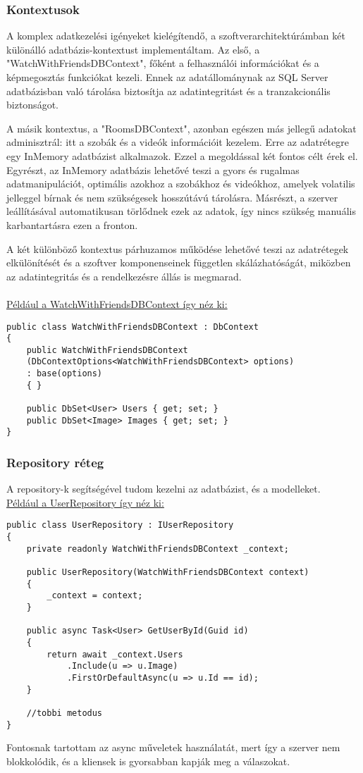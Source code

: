 \subsubsection*{Kontextusok}
A komplex adatkezelési igényeket kielégítendő, a szoftverarchitektúrámban két különálló adatbázis-kontextust implementáltam. Az első, a "WatchWithFriendsDBContext", főként a felhasználói információkat és a képmegosztás funkciókat kezeli. Ennek az adatállománynak az SQL Server adatbázisban való tárolása biztosítja az adatintegritást és a tranzakcionális biztonságot.

A másik kontextus, a "RoomsDBContext", azonban egészen más jellegű adatokat adminisztrál: itt a szobák és a videók információit kezelem. Erre az adatrétegre egy InMemory adatbázist alkalmazok. Ezzel a megoldással két fontos célt érek el. Egyrészt, az InMemory adatbázis lehetővé teszi a gyors és rugalmas adatmanipulációt, optimális azokhoz a szobákhoz és videókhoz, amelyek volatilis jelleggel bírnak és nem szükségesek hosszútávú tárolásra. Másrészt, a szerver leállításával automatikusan törlődnek ezek az adatok, így nincs szükség manuális karbantartásra ezen a fronton.

A két különböző kontextus párhuzamos működése lehetővé teszi az adatrétegek elkülönítését és a szoftver komponenseinek független skálázhatóságát, miközben az adatintegritás és a rendelkezésre állás is megmarad.
\\
\\
\underline{Például a WatchWithFriendsDBContext így néz ki:}
\begin{lstlisting}[language=CSharp,style=CSharpBase,caption={WatchWithFriendsDBContext}]
public class WatchWithFriendsDBContext : DbContext
{
    public WatchWithFriendsDBContext
    (DbContextOptions<WatchWithFriendsDBContext> options) 
    : base(options)
    { }

    public DbSet<User> Users { get; set; }
    public DbSet<Image> Images { get; set; }
}
\end{lstlisting}
\vspace{1em}
\subsubsection*{Repository réteg}
A repository-k segítségével tudom kezelni az adatbázist, és a modelleket.
\\
\underline{Például a UserRepository így néz ki:}
\begin{lstlisting}[language=CSharp,style=CSharpBase,caption={User Repository}]
public class UserRepository : IUserRepository
{
    private readonly WatchWithFriendsDBContext _context;

    public UserRepository(WatchWithFriendsDBContext context)
    {
        _context = context;
    }

    public async Task<User> GetUserById(Guid id)
    {
        return await _context.Users
            .Include(u => u.Image)
            .FirstOrDefaultAsync(u => u.Id == id);
    }

    //tobbi metodus
}
\end{lstlisting}
\vspace{1em}
Fontosnak tartottam az async műveletek használatát, mert így a szerver nem blokkolódik, és a kliensek is gyorsabban kapják meg a válaszokat.
